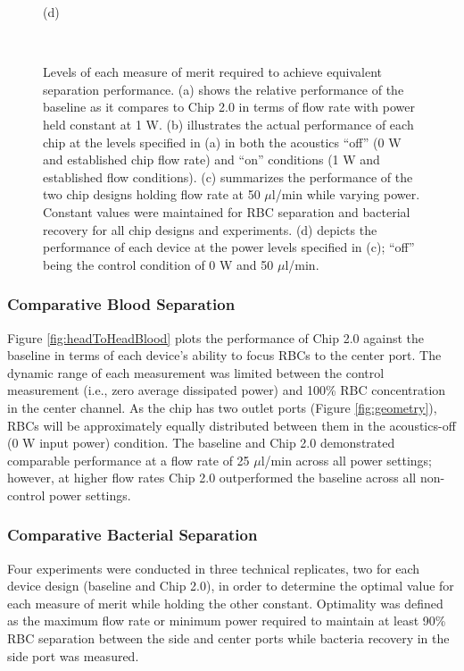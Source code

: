 \begin{figure}[htb]
\begin{minipage}[t]{0.49\linewidth}
    \medskip
    \centerline{(d)}
  \end{minipage}\\
  \caption[Bacterial separation performance comparison]{Levels of each measure of merit required to achieve equivalent separation performance. (a) shows the relative performance of the baseline as it compares to Chip 2.0 in terms of flow rate with power held constant at 1 W. (b) illustrates the actual performance of each chip at the levels specified in (a) in both the acoustics ``off'' (0 W and established chip flow rate) and ``on'' conditions (1 W and established flow conditions). (c) summarizes the performance of the two chip designs holding flow rate at 50 $\mu$l/min while varying power. Constant values were maintained for RBC separation and bacterial recovery for all chip designs and experiments. (d) depicts the performance of each device at the power levels specified in (c); ``off'' being the control condition of 0 W and 50 $\mu$l/min.}
	\label{fig:bacPerf}
\end{figure}

\subsubsection{Comparative Blood Separation}
\label{sssec:comparisonBlood}

Figure \ref{fig:headToHeadBlood} plots the performance of Chip 2.0 against the baseline in terms of each device's ability to focus RBCs to the center port. The dynamic range of each measurement was limited between the control measurement (i.e., zero average dissipated power) and 100\% RBC concentration in the center channel. As the chip has two outlet ports (Figure \ref{fig:geometry}), RBCs will be approximately equally distributed between them in the acoustics-off (0 W input power) condition. The baseline and Chip 2.0 demonstrated comparable performance at a flow rate of 25 $\mu$l/min across all power settings; however, at higher flow rates Chip 2.0 outperformed the baseline across all non-control power settings. 



\subsubsection{Comparative Bacterial Separation}
\label{sssec:comparisonBacteria}

Four experiments were conducted in three technical replicates, two for each device design (baseline and Chip 2.0),  in order to determine the optimal value for each measure of merit while holding the other constant. Optimality was defined as the maximum flow rate or minimum power required to maintain at least 90\% RBC separation between the side and center ports while bacteria recovery in the side port was measured. 

